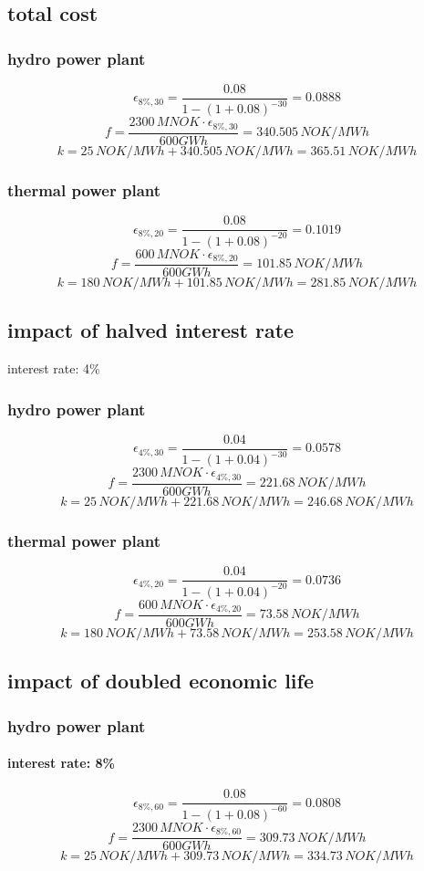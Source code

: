 \documentclass{article}
\begin{document}
\subsection{total cost}
\subsubsection{hydro power plant}
$$\epsilon_{8\%,30}=\frac{0.08}{1-(1+0.08)^{-30}}=0.0888$$
$$f=\frac{2300\,MNOK\cdot\epsilon_{8\%,30}}{600GWh}=340.505\,NOK/MWh$$
$$k=25\,NOK/MWh+340.505\,NOK/MWh=365.51\,NOK/MWh$$
\subsubsection{thermal power plant}
$$\epsilon_{8\%,20}=\frac{0.08}{1-(1+0.08)^{-20}}=0.1019$$
$$f=\frac{600\,MNOK\cdot\epsilon_{8\%,20}}{600GWh}=101.85\,NOK/MWh$$
$$k=180\,NOK/MWh+101.85\,NOK/MWh=281.85\,NOK/MWh$$
\subsection{impact of halved interest rate}
interest rate: 4\%
\subsubsection{hydro power plant}
$$\epsilon_{4\%,30}=\frac{0.04}{1-(1+0.04)^{-30}}=0.0578$$
$$f=\frac{2300\,MNOK\cdot\epsilon_{4\%,30}}{600GWh}=221.68\,NOK/MWh$$
$$k=25\,NOK/MWh+221.68\,NOK/MWh=246.68\,NOK/MWh$$
\subsubsection{thermal power plant}
$$\epsilon_{4\%,20}=\frac{0.04}{1-(1+0.04)^{-20}}=0.0736$$
$$f=\frac{600\,MNOK\cdot\epsilon_{4\%,20}}{600GWh}=73.58\,NOK/MWh$$
$$k=180\,NOK/MWh+73.58\,NOK/MWh=253.58\,NOK/MWh$$
\subsection{impact of doubled economic life}
\subsubsection{hydro power plant}
\paragraph{interest rate: 8\%\\}
$$\epsilon_{8\%,60}=\frac{0.08}{1-(1+0.08)^{-60}}=0.0808$$
$$f=\frac{2300\,MNOK\cdot\epsilon_{8\%,60}}{600GWh}=309.73\,NOK/MWh$$
$$k=25\,NOK/MWh+309.73\,NOK/MWh=334.73\,NOK/MWh$$
\end{document}
